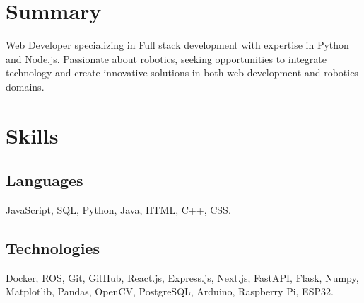 \documentclass[9pt]{cv}
\begin{document}
\begin{multicols}{2}
    \maketitle

    \columnbreak

    \begin{multicols}{2}

        \columnbreak


    \end{multicols}
\end{multicols}

\begin{multicols}{2}
    \section*{Summary}
    Web Developer specializing in Full stack development with expertise in Python and Node.js. Passionate about robotics, seeking opportunities to integrate technology and create innovative solutions in both web development and robotics domains.
    \vfill\null %

    \columnbreak

    \section*{Skills}
    \subsection*{Languages}
    \parbox[t]{\dimexpr\columnwidth-5em}{
        JavaScript, SQL, Python, Java, HTML, C++, CSS.
    }

    \subsection*{Technologies}
    \parbox[t]{\dimexpr\columnwidth-7em}{
        Docker, ROS, Git, GitHub, React.js, Express.js, Next.js, FastAPI, Flask, Numpy, Matplotlib, Pandas, OpenCV, PostgreSQL, Arduino, Raspberry Pi, ESP32.
    }
\end{multicols}








\makefooter
\end{document}
